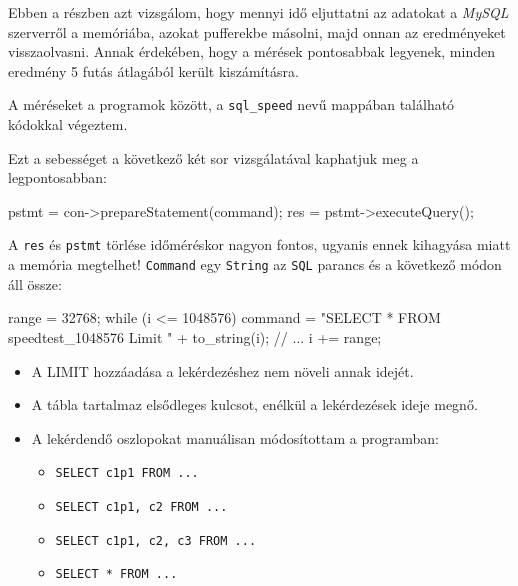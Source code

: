 


Ebben a részben azt vizsgálom, hogy mennyi idő eljuttatni az adatokat a \textit{MySQL} szerverről a memóriába, azokat pufferekbe másolni, majd onnan az eredményeket visszaolvasni.
Annak érdekében, hogy a mérések pontosabbak legyenek, minden eredmény 5 futás átlagából került kiszámításra.


A méréseket a programok között, a \texttt{sql\_speed} nevű mappában található kódokkal végeztem.

Ezt a sebességet a következő két sor vizsgálatával kaphatjuk meg a legpontosabban:
\begin{python}
pstmt = con->prepareStatement(command);
res = pstmt->executeQuery();
\end{python}
A  \texttt{res} és \texttt{pstmt} törlése időméréskor nagyon fontos, ugyanis ennek kihagyása miatt a memória megtelhet!
\texttt{Command} egy \texttt{String} az \texttt{SQL} parancs és a következő módon áll össze:
\begin{python}
range = 32768;
while (i <= 1048576)
{
   command = "SELECT * FROM speedtest_1048576 Limit " + to_string(i);
   // ...
   i += range;
}
\end{python}
\begin{itemize}
\item A LIMIT hozzáadása a lekérdezéshez nem növeli annak idejét.
\item A tábla tartalmaz elsődleges kulcsot, enélkül a lekérdezések ideje megnő.
\item A lekérdendő oszlopokat manuálisan módosítottam a programban: 
\begin{itemize} 
\item \texttt{SELECT c1p1 FROM ...}
\item \texttt{SELECT c1p1, c2 FROM ...} 
\item \texttt{SELECT c1p1, c2, c3 FROM ...} 
\item \texttt{SELECT * FROM ...} 
\end{itemize}
\end{itemize}

